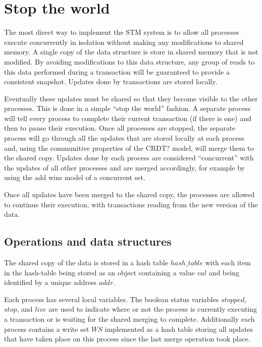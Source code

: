 \documentclass[11pt,letterpaper]{article}
\begin{document}
\section{Stop the world}

The most direct way to implement the STM system is to allow all processes
execute concurrently in isolation without making any modifications to shared memory.
A single copy of the data structure is store in shared memory that is not modified.
By avoiding modifications to this data structure, any group of reads to this data
performed during a transaction will be guaranteed to provide a consistent snapshot.
Updates done by transactions are stored locally.

Eventually these updates must be shared so that they become visible to the other processes.
This is done in a simple ``stop the world'' fashion.
A separate process will tell every process to complete their current transaction (if there is one) and then to pause
their execution.
Once all processes are stopped, the separate process will go through all the updates that are stored locally at
each process and, using the communitive properties of the CRDT? model, will merge them to the shared copy.
Updates done by each process are considered ``concurrent'' with the updates of all other processes and are merged
accordingly, for example by using the add wins model of a concurrent set.

Once all updates have been merged to the shared copy, the processes are allowed to continue their execution,
with transactions reading from the new version of the data.


\subsection{Operations and data structures}

The shared copy of the data is stored in a hash table
$\mathit{hash\_table}$ with each item in the hash-table
being stored as an object
containing a value $\mathit{val}$ and
being identified by a unique address $\mathit{addr}$.

Each process has several local variables.
The boolean status variables $\mathit{stopped}$,
$\mathit{stop}$, and $\mathit{live}$ are used to indicate
where or not the process is currently executing a transaction
or is waiting for the shared merging to complete.
Additionally each process contains a write set $\mathit{WS}$
implemented as a hash table
storing all updates that have taken place on this process
since the last merge operation took place.
\end{document}
